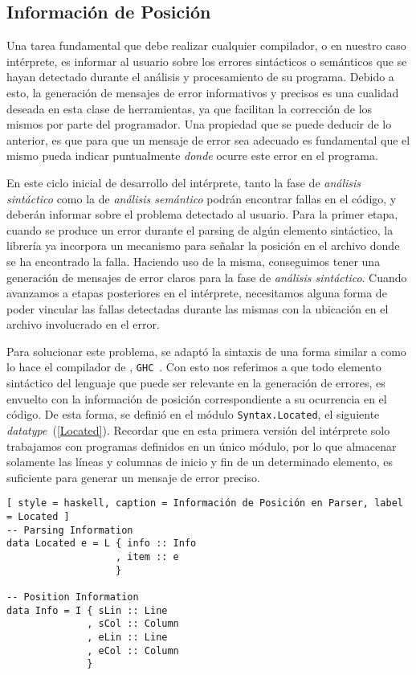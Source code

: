 \subsection{Información de Posición}

Una tarea fundamental que debe realizar cualquier compilador, o en nuestro caso intérprete, es informar al usuario sobre los errores sintácticos o semánticos que se hayan detectado durante el análisis y procesamiento de su programa.
Debido a esto, la generación de mensajes de error informativos y precisos es una cualidad deseada en esta clase de herramientas, ya que facilitan la corrección de los mismos por parte del programador.
Una propiedad que se puede deducir de lo anterior, es que para que un mensaje de error sea adecuado es fundamental que el mismo pueda indicar puntualmente \textit{donde} ocurre este error en el programa.

En este ciclo inicial de desarrollo del intérprete, tanto la fase de \textit{análisis sintáctico} como la de \textit{análisis semántico} podrán encontrar fallas en el código, y deberán informar sobre el problema detectado al usuario.
Para la primer etapa, cuando se produce un error durante el parsing de algún elemento sintáctico, la librería \Megaparsec{} ya incorpora un mecanismo para señalar la posición en el archivo donde se ha encontrado la falla.
Haciendo uso de la misma, conseguimos tener una generación de mensajes de error claros para la fase de \textit{análisis sintáctico}.
Cuando avanzamos a etapas posteriores en el intérprete, necesitamos alguna forma de poder vincular las fallas detectadas durante las mismas con la ubicación en el archivo involucrado en el error.

Para solucionar este problema, se adaptó la sintaxis de una forma similar a como lo hace el compilador de \Haskell{}, \texttt{GHC}~\cite{GHC}.
Con esto nos referimos a que todo elemento sintáctico del lenguaje que puede ser relevante en la generación de errores, es envuelto con la información de posición correspondiente a su ocurrencia en el código.
De esta forma, se definió en el módulo \lstinline[style = module]{Syntax.Located}, el siguiente \textit{datatype}~(\ref{Located}).
Recordar que en esta primera versión del intérprete solo trabajamos con programas definidos en un único módulo, por lo que almacenar solamente las líneas y columnas de inicio y fin de un determinado elemento, es suficiente para generar un mensaje de error preciso.

\begin{lstlisting}[ style = haskell, caption = Información de Posición en Parser, label = Located ]
-- Parsing Information
data Located e = L { info :: Info
                   , item :: e
                   }

-- Position Information
data Info = I { sLin :: Line
              , sCol :: Column
              , eLin :: Line
              , eCol :: Column
              }
\end{lstlisting}

